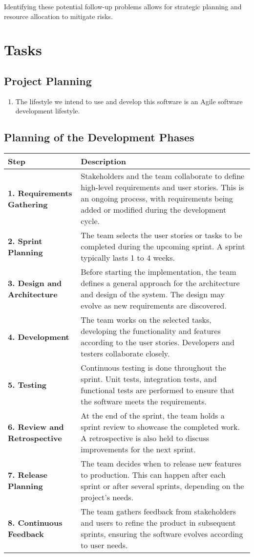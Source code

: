 \documentclass[12pt]{article}
\begin{document}
Identifying these potential follow-up problems allows for strategic planning and resource allocation to mitigate risks.


\section{Tasks}
\subsection{Project Planning}
\begin{enumerate}
  \item The lifestyle we intend to use and develop this software is an Agile software development lifestyle.
\end{enumerate}

\subsection{Planning of the Development Phases}
\begin{longtable}{| m{3cm} | m{10cm} |}
  \hline
  \textbf{Step} & \textbf{Description} \\
  \hline
  \textbf{1. Requirements Gathering} & Stakeholders and the team collaborate to define high-level requirements and user stories. This is an ongoing process, with requirements being added or modified during the development cycle. \\
  \hline
  \textbf{2. Sprint Planning} & The team selects the user stories or tasks to be completed during the upcoming sprint. A sprint typically lasts 1 to 4 weeks. \\
  \hline
  \textbf{3. Design and Architecture} & Before starting the implementation, the team defines a general approach for the architecture and design of the system. The design may evolve as new requirements are discovered. \\
  \hline
  \textbf{4. Development} & The team works on the selected tasks, developing the functionality and features according to the user stories. Developers and testers collaborate closely. \\
  \hline
  \textbf{5. Testing} & Continuous testing is done throughout the sprint. Unit tests, integration tests, and functional tests are performed to ensure that the software meets the requirements. \\
  \hline
  \textbf{6. Review and Retrospective} & At the end of the sprint, the team holds a sprint review to showcase the completed work. A retrospective is also held to discuss improvements for the next sprint. \\
  \hline
  \textbf{7. Release Planning} & The team decides when to release new features to production. This can happen after each sprint or after several sprints, depending on the project's needs. \\
  \hline
  \textbf{8. Continuous Feedback} & The team gathers feedback from stakeholders and users to refine the product in subsequent sprints, ensuring the software evolves according to user needs. \\
  \hline
  \end{longtable}
\end{document}
